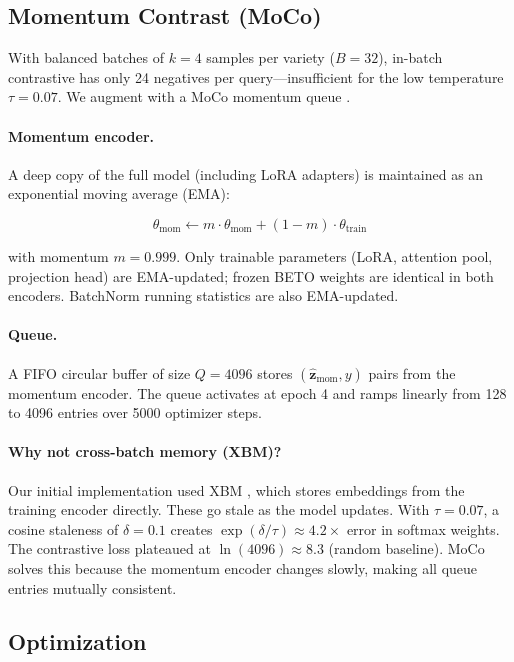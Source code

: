 \documentclass[11pt,a4paper]{article}
\begin{document}
\subsection{Momentum Contrast (MoCo)}

With balanced batches of $k = 4$ samples per variety ($B = 32$), in-batch
contrastive has only 24 negatives per query---insufficient for the low
temperature $\tau = 0.07$. We augment with a MoCo momentum queue
\citep{he2020momentum}.

\paragraph{Momentum encoder.}
A deep copy of the full model (including LoRA adapters) is maintained as an
exponential moving average (EMA):

\begin{equation}
    \theta_{\text{mom}} \leftarrow m \cdot \theta_{\text{mom}}
    + (1 - m) \cdot \theta_{\text{train}}
\end{equation}

with momentum $m = 0.999$. Only trainable parameters (LoRA, attention pool,
projection head) are EMA-updated; frozen BETO weights are identical in both
encoders. BatchNorm running statistics are also EMA-updated.

\paragraph{Queue.}
A FIFO circular buffer of size $Q = 4096$ stores $(\hat{\mathbf{z}}_{\text{mom}}, y)$
pairs from the momentum encoder. The queue activates at epoch 4 and ramps
linearly from 128 to 4096 entries over 5000 optimizer steps.

\paragraph{Why not cross-batch memory (XBM)?}
Our initial implementation used XBM \citep{wang2020cross}, which stores
embeddings from the training encoder directly. These go stale as the model
updates. With $\tau = 0.07$, a cosine staleness of $\delta = 0.1$ creates
$\exp(\delta / \tau) \approx 4.2\times$ error in softmax weights. The
contrastive loss plateaued at $\ln(4096) \approx 8.3$ (random baseline).
MoCo solves this because the momentum encoder changes slowly, making all
queue entries mutually consistent.

\subsection{Optimization}
\end{document}
